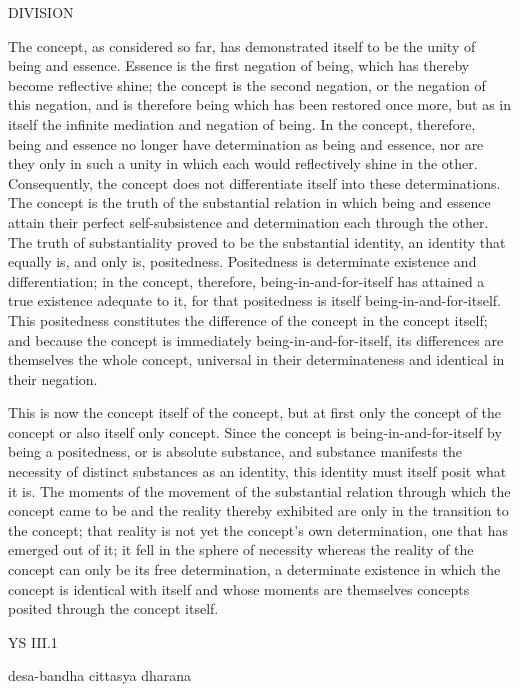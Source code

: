 
DIVISION

The concept, as considered so far,
has demonstrated itself to be
the unity of being and essence.
Essence is the first negation of being,
which has thereby become reflective shine;
the concept is the second negation,
or the negation of this negation,
and is therefore being
which has been restored once more,
but as in itself the infinite mediation
and negation of being.
In the concept, therefore,
being and essence no longer have
determination as being and essence,
nor are they only in such a unity
in which each would reflectively shine in the other.
Consequently, the concept does not differentiate
itself into these determinations.
The concept is the truth of the substantial relation
in which being and essence attain their perfect
self-subsistence and determination each through the other.
The truth of substantiality proved
to be the substantial identity,
an identity that equally is,
and only is, positedness.
Positedness is determinate existence and differentiation;
in the concept, therefore, being-in-and-for-itself
has attained a true existence adequate to it,
for that positedness is itself being-in-and-for-itself.
This positedness constitutes the difference
of the concept in the concept itself;
and because the concept is
immediately being-in-and-for-itself,
its differences are themselves the whole concept,
universal in their determinateness
and identical in their negation.

This is now the concept itself of the concept,
but at first only the concept of the concept
or also itself only concept.
Since the concept is being-in-and-for-itself
by being a positedness, or is absolute substance,
and substance manifests the necessity of
distinct substances as an identity,
this identity must itself posit what it is.
The moments of the movement of the substantial relation
through which the concept came to be
and the reality thereby exhibited are
only in the transition to the concept;
that reality is not yet the
concept's own determination,
one that has emerged out of it;
it fell in the sphere of necessity
whereas the reality of the concept
can only be its free determination,
a determinate existence in which
the concept is identical with itself
and whose moments are themselves concepts
posited through the concept itself.

YS III.1

    desa-bandha cittasya dharana

